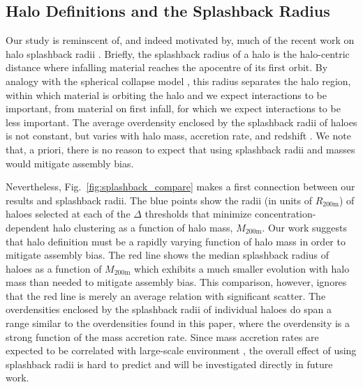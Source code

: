 \documentclass[usenatbib,fleqn]{mnras}
\begin{document}
\subsection{Halo Definitions and the Splashback Radius}
\label{subsection:splashback}

Our study is reminscent of, and indeed motivated by, much of the recent work on halo splashback radii \citep{more_etal15, mansfield_etal16, diemer_etal17}. Briefly, the splashback radius of a halo is the halo-centric distance where infalling material reaches the apocentre of its first orbit. By analogy with the spherical collapse model \citep[e.g.,][]{fillmore_goldreich84}, this radius separates the halo region, within which material is orbiting the halo and we expect interactions to be important, from material on first infall, for which we expect interactions to be less important. The average overdensity enclosed by the splashback radii of haloes is not constant, but varies with halo mass, accretion rate, and redshift \citep{mansfield_etal16, diemer_etal17}. We note that, a priori, there is no reason to expect that using splashback radii and masses would mitigate assembly bias. 

Nevertheless, Fig.~\ref{fig:splashback_compare} makes a first connection between our results and splashback radii. The blue points show the radii (in units of $R_{200\text{m}}$) of haloes selected at each of the $\Delta$ thresholds that minimize concentration-dependent halo clustering as a function of halo mass, $M_{200\text{m}}$. Our work suggests that halo definition must be a rapidly varying function of halo mass in order to mitigate assembly bias. The red line shows the median splashback radius of haloes as a function of $M_{200\text{m}}$ \citep{diemer_etal17} which exhibits a much smaller evolution with halo mass than needed to mitigate assembly bias. This comparison, however, ignores that the red line is merely an average relation with significant scatter. The overdensities enclosed by the splashback radii of individual haloes do span a range similar to the overdensities found in this paper, where the overdensity is a strong function of the mass accretion rate. Since mass accretion rates are expected to be correlated with large-scale environment \citep[e.g.,][]{hearin_etal16}, the overall effect of using splashback radii is hard to predict and will be investigated directly in future work.
\end{document}
